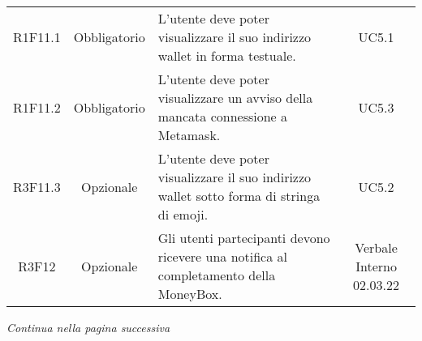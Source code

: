 \begin{table}[H]
\begin{tabular}{c | c | p{6cm} | c}
        R1F11.1                                                           & Obbligatorio & L'utente deve poter visualizzare il suo indirizzo wallet\glo{} in forma testuale.                          & UC5.1                    \\
        R1F11.2                                                           & Obbligatorio & L'utente deve poter visualizzare un avviso della mancata connessione a Metamask\glo{}.                     & UC5.3                    \\
        R3F11.3                                                           & Opzionale    & L'utente deve poter visualizzare il suo indirizzo wallet\glo{} sotto forma di stringa di emoji.            & UC5.2                    \\
        R3F12                                                             & Opzionale    & Gli utenti partecipanti devono ricevere una notifica al completamento della MoneyBox\glo{}.                & Verbale Interno 02.03.22 \\
    \end{tabular}
\end{table}
\begin{center}
    \textit{\small Continua nella pagina successiva}
\end{center}
